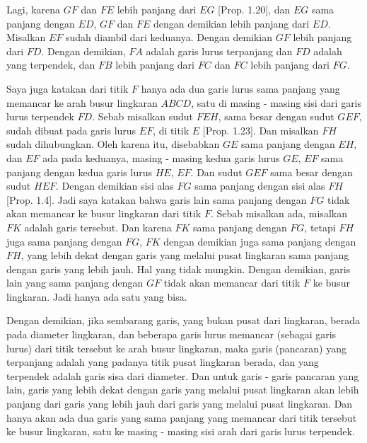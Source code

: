 \documentclass[a4paper]{book}
\begin{document}
Lagi, karena $GF$ dan $FE$ lebih panjang dari $EG$ [Prop. 1.20], dan $EG$ sama
panjang dengan $ED$, $GF$ dan $FE$ dengan demikian lebih panjang dari $ED$.
Misalkan $EF$ sudah diambil dari keduanya. Dengan demikian $GF$ lebih panjang
dari $FD$. Dengan demikian, $FA$ adalah garis lurus terpanjang dan $FD$ adalah
yang terpendek, dan $FB$ lebih panjang dari $FC$ dan $FC$ lebih panjang dari 
$FG$.

Saya juga katakan dari titik $F$ hanya ada dua garis lurus sama panjang
yang memancar ke arah busur lingkaran $ABCD$, satu di masing - masing sisi
dari garis lurus terpendek $FD$. Sebab misalkan sudut $FEH$, sama besar dengan
sudut $GEF$, sudah dibuat pada garis lurus $EF$, di titik $E$ [Prop. 1.23]. 
Dan misalkan $FH$ sudah dihubungkan. Oleh karena itu, disebabkan $GE$ sama 
panjang dengan $EH$, dan $EF$ ada pada keduanya, masing - masing kedua garis 
lurus $GE$, $EF$ sama panjang dengan kedua garis lurus $HE$, $EF$. Dan sudut 
$GEF$ sama besar dengan sudut $HEF$. Dengan demikian sisi alas $FG$ sama 
panjang  dengan sisi alas $FH$ [Prop. 1.4]. Jadi saya katakan bahwa garis lain
sama panjang dengan $FG$ tidak akan  memancar ke busur lingkaran dari titik 
$F$. Sebab misalkan ada, misalkan $FK$ adalah garis tersebut. Dan karena $FK$
sama panjang dengan $FG$, tetapi $FH$ juga sama panjang dengan $FG$, $FK$ 
dengan demikian juga sama panjang dengan $FH$, yang lebih dekat dengan garis
yang melalui pusat lingkaran sama panjang dengan garis yang lebih jauh. Hal
yang tidak mungkin. Dengan demikian, garis lain yang sama panjang dengan $GF$
tidak akan memancar dari titik $F$ ke busur lingkaran. Jadi hanya ada satu
yang bisa.

Dengan demikian, jika sembarang garis, yang bukan pusat dari lingkaran, 
berada pada diameter lingkaran, dan beberapa garis lurus memancar 
(sebagai garis lurus) dari titik tersebut ke arah busur lingkaran, 
maka garis (pancaran) yang terpanjang adalah 
yang padanya titik pusat lingkaran berada, dan yang terpendek adalah garis 
sisa dari diameter. Dan untuk garis - garis 
pancaran yang lain, garis yang 
lebih dekat 
dengan garis yang melalui pusat lingkaran akan 
lebih panjang dari garis yang lebih jauh dari garis yang melalui pusat lingkaran. 
Dan hanya akan ada dua 
garis yang sama panjang yang memancar dari titik tersebut ke busur lingkaran, 
satu ke masing - masing sisi arah dari garis lurus terpendek.  

\end{document}

